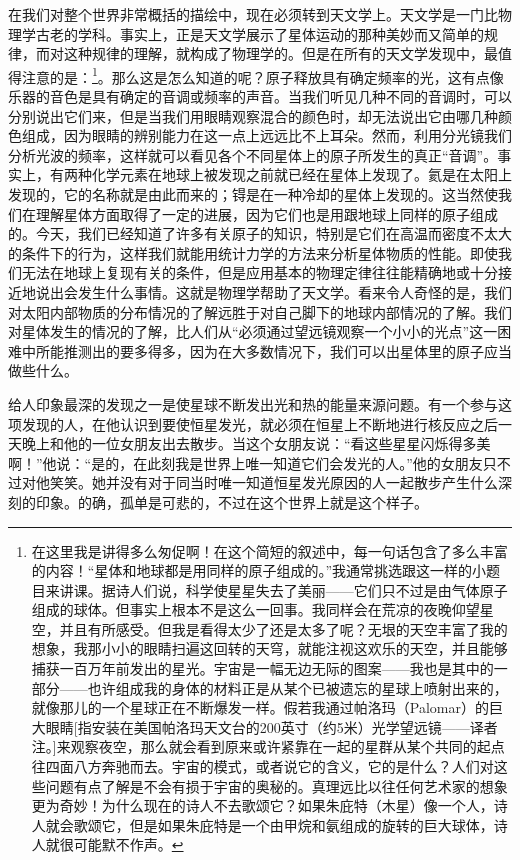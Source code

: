 在我们对整个世界非常概括的描绘中，现在必须转到天文学上。天文学是一门比物理学古老的学科。事实上，正是天文学展示了星体运动的那种美妙而又简单的规律，而对这种规律的理解，就构成了物理学的。但是在所有的天文学发现中，最值得注意的是：\footnote{在这里我是讲得多么匆促啊！在这个简短的叙述中，每一句话包含了多么丰富的内容！“星体和地球都是用同样的原子组成的。”我通常挑选跟这一样的小题目来讲课。据诗人们说，科学使星星失去了美丽——它们只不过是由气体原子组成的球体。但事实上根本不是这么一回事。我同样会在荒凉的夜晚仰望星空，并且有所感受。但我是看得太少了还是太多了呢？无垠的天空丰富了我的想象，我那小小的眼睛扫遍这回转的天穹，就能注视这欢乐的天空，并且能够捕获一百万年前发出的星光。宇宙是一幅无边无际的图案——我也是其中的一部分——也许组成我的身体的材料正是从某个已被遗忘的星球上喷射出来的，就像那儿的一个星球正在不断爆发一样。假若我通过帕洛玛（Palomar）的巨大眼睛[指安装在美国帕洛玛天文台的200英寸（约5米）光学望远镜——译者注。]来观察夜空，那么就会看到原来或许紧靠在一起的星群从某个共同的起点往四面八方奔驰而去。宇宙的模式，或者说它的含义，它的是什么？人们对这些问题有点了解是不会有损于宇宙的奥秘的。真理远比以往任何艺术家的想象更为奇妙！为什么现在的诗人不去歌颂它？如果朱庇特（木星）像一个人，诗人就会歌颂它，但是如果朱庇特是一个由甲烷和氨组成的旋转的巨大球体，诗人就很可能默不作声。}。那么这是怎么知道的呢？原子释放具有确定频率的光，这有点像乐器的音色是具有确定的音调或频率的声音。当我们听见几种不同的音调时，可以分别说出它们来，但是当我们用眼睛观察混合的颜色时，却无法说出它由哪几种颜色组成，因为眼睛的辨别能力在这一点上远远比不上耳朵。然而，利用分光镜我们分析光波的频率，这样就可以看见各个不同星体上的原子所发生的真正“音调”。事实上，有两种化学元素在地球上被发现之前就已经在星体上发现了。氦是在太阳上发现的，它的名称就是由此而来的；锝是在一种冷却的星体上发现的。这当然使我们在理解星体方面取得了一定的进展，因为它们也是用跟地球上同样的原子组成的。今天，我们已经知道了许多有关原子的知识，特别是它们在高温而密度不太大的条件下的行为，这样我们就能用统计力学的方法来分析星体物质的性能。即使我们无法在地球上复现有关的条件，但是应用基本的物理定律往往能精确地或十分接近地说出会发生什么事情。这就是物理学帮助了天文学。看来令人奇怪的是，我们对太阳内部物质的分布情况的了解远胜于对自己脚下的地球内部情况的了解。我们对星体发生的情况的了解，比人们从“必须通过望远镜观察一个小小的光点”这一困难中所能推测出的要多得多，因为在大多数情况下，我们可以出星体里的原子应当做些什么。

给人印象最深的发现之一是使星球不断发出光和热的能量来源问题。有一个参与这项发现的人，在他认识到要使恒星发光，就必须在恒星上不断地进行核反应之后一天晚上和他的一位女朋友出去散步。当这个女朋友说：“看这些星星闪烁得多美啊！”他说：“是的，在此刻我是世界上唯一知道它们会发光的人。”他的女朋友只不过对他笑笑。她并没有对于同当时唯一知道恒星发光原因的人一起散步产生什么深刻的印象。的确，孤单是可悲的，不过在这个世界上就是这个样子。

